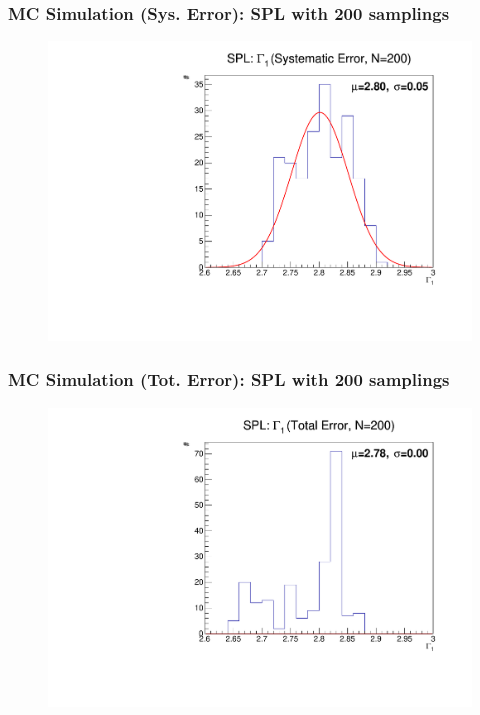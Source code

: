 \documentclass{beamer}
\begin{document}
\begin{frame}
  \frametitle{MC Simulation (Sys. Error): SPL with 200 samplings}
  \begin{figure}[h!]
  \includegraphics[height=0.8\textheight]{figure/monte_carlo/N200/SPLwHe_gamma1_sys.pdf}
  \end{figure}
\end{frame}

\begin{frame}
  \frametitle{MC Simulation (Tot. Error): SPL with 200 samplings}
  \begin{figure}[h!]
  \includegraphics[height=0.8\textheight]{figure/monte_carlo/N200/SPLwHe_gamma1_tot.pdf}
  \end{figure}
\end{frame}
\end{document}

